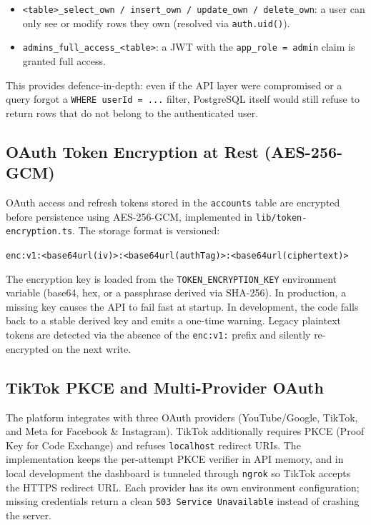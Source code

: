 \begin{itemize}
    \item \texttt{<table>\_select\_own / insert\_own / update\_own / delete\_own}: a user can only see or modify rows they own (resolved via \texttt{auth.uid()}).
    \item \texttt{admins\_full\_access\_<table>}: a JWT with the \texttt{app\_role = admin} claim is granted full access.
\end{itemize}

This provides defence-in-depth: even if the API layer were compromised or a query forgot a \texttt{WHERE userId = ...} filter, PostgreSQL itself would still refuse to return rows that do not belong to the authenticated user.

\subsection{OAuth Token Encryption at Rest (AES-256-GCM)}

OAuth access and refresh tokens stored in the \texttt{accounts} table are encrypted before persistence using AES-256-GCM, implemented in \texttt{lib/token-encryption.ts}. The storage format is versioned:

\begin{center}
\texttt{enc:v1:<base64url(iv)>:<base64url(authTag)>:<base64url(ciphertext)>}
\end{center}

The encryption key is loaded from the \texttt{TOKEN\_ENCRYPTION\_KEY} environment variable (base64, hex, or a passphrase derived via SHA-256). In production, a missing key causes the API to fail fast at startup. In development, the code falls back to a stable derived key and emits a one-time warning. Legacy plaintext tokens are detected via the absence of the \texttt{enc:v1:} prefix and silently re-encrypted on the next write.

\subsection{TikTok PKCE and Multi-Provider OAuth}

The platform integrates with three OAuth providers (YouTube/Google, TikTok, and Meta for Facebook \& Instagram). TikTok additionally requires PKCE (Proof Key for Code Exchange) and refuses \texttt{localhost} redirect URIs. The implementation keeps the per-attempt PKCE verifier in API memory, and in local development the dashboard is tunneled through \texttt{ngrok} so TikTok accepts the HTTPS redirect URL. Each provider has its own environment configuration; missing credentials return a clean \texttt{503 Service Unavailable} instead of crashing the server.

